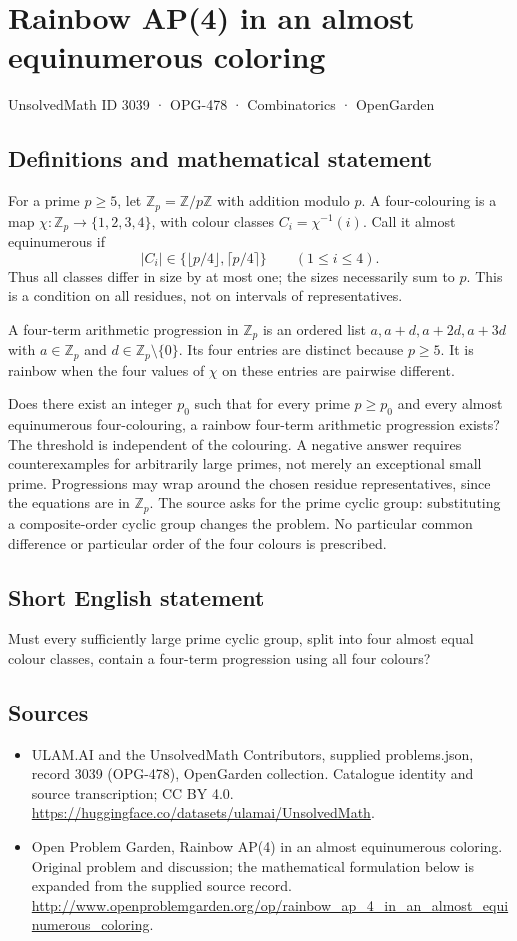\documentclass[11pt,a4paper]{article}
\begin{document}
\section*{Rainbow AP(4) in an almost equinumerous coloring}\label{3039}
{\small UnsolvedMath ID 3039 · OPG-478 · Combinatorics · OpenGarden}
\subsection{Definitions and mathematical statement}
For a prime $p\ge5$, let $\mathbb Z_p=\mathbb Z/p\mathbb Z$ with addition
modulo $p$. A four-colouring is a map $\chi:\mathbb Z_p\to\{1,2,3,4\}$,
with colour classes $C_i=\chi^{-1}(i)$. Call it almost equinumerous if
\[
 |C_i|\in\{\lfloor p/4\rfloor,\lceil p/4\rceil\}
 \qquad(1\le i\le4).
\]
Thus all classes differ in size by at most one; the sizes necessarily sum
to $p$. This is a condition on all residues, not on intervals of representatives.

A four-term arithmetic progression in $\mathbb Z_p$ is an ordered list
$a,a+d,a+2d,a+3d$ with $a\in\mathbb Z_p$ and
$d\in\mathbb Z_p\setminus\{0\}$. Its four entries are distinct because
$p\ge5$. It is rainbow when the four values of $\chi$ on these entries are
pairwise different.

Does there exist an integer $p_0$ such that for every prime $p\ge p_0$ and
every almost equinumerous four-colouring, a rainbow four-term arithmetic
progression exists? The threshold is independent of the colouring. A
negative answer requires counterexamples for arbitrarily large primes,
not merely an exceptional small prime. Progressions may wrap around the
chosen residue representatives, since the equations are in $\mathbb Z_p$.
The source asks for the prime cyclic group: substituting a composite-order
cyclic group changes the problem. No particular common difference or
particular order of the four colours is prescribed.
\subsection{Short English statement}
Must every sufficiently large prime cyclic group, split into four almost equal colour classes, contain a four-term progression using all four colours?
\subsection{Sources}
\begin{itemize}
\item[S1] ULAM.AI and the UnsolvedMath Contributors, supplied problems.json, record 3039 (OPG-478), OpenGarden collection. Catalogue identity and source transcription; CC BY 4.0.
\url{https://huggingface.co/datasets/ulamai/UnsolvedMath}.
\item[S2] Open Problem Garden, Rainbow AP(4) in an almost equinumerous coloring. Original problem and discussion; the mathematical formulation below is expanded from the supplied source record.
\url{http://www.openproblemgarden.org/op/rainbow_ap_4_in_an_almost_equinumerous_coloring}.
\end{itemize}
\end{document}
